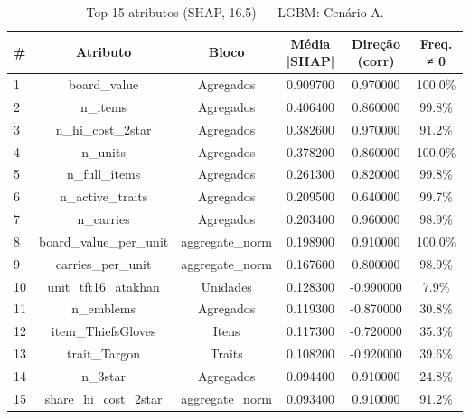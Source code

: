 \begin{table}[htbp]
\caption{Top 15 atributos (SHAP, 16.5) — LGBM: Cenário A.}
\label{tab:toplgbm_A}
\centering
\small
\begin{tabular}{lccccc}
\toprule
\# & Atributo & Bloco & Média |SHAP| & Direção (corr) & Freq. ≠ 0 \\
\midrule
1 & board\_value & Agregados & 0.909700 & 0.970000 & 100.0\% \\
2 & n\_items & Agregados & 0.406400 & 0.860000 & 99.8\% \\
3 & n\_hi\_cost\_2star & Agregados & 0.382600 & 0.970000 & 91.2\% \\
4 & n\_units & Agregados & 0.378200 & 0.860000 & 100.0\% \\
5 & n\_full\_items & Agregados & 0.261300 & 0.820000 & 99.8\% \\
6 & n\_active\_traits & Agregados & 0.209500 & 0.640000 & 99.7\% \\
7 & n\_carries & Agregados & 0.203400 & 0.960000 & 98.9\% \\
8 & board\_value\_per\_unit & aggregate\_norm & 0.198900 & 0.910000 & 100.0\% \\
9 & carries\_per\_unit & aggregate\_norm & 0.167600 & 0.800000 & 98.9\% \\
10 & unit\_tft16\_atakhan & Unidades & 0.128300 & -0.990000 & 7.9\% \\
11 & n\_emblems & Agregados & 0.119300 & -0.870000 & 30.8\% \\
12 & item\_ThiefsGloves & Itens & 0.117300 & -0.720000 & 35.3\% \\
13 & trait\_Targon & Traits & 0.108200 & -0.920000 & 39.6\% \\
14 & n\_3star & Agregados & 0.094400 & 0.910000 & 24.8\% \\
15 & share\_hi\_cost\_2star & aggregate\_norm & 0.093400 & 0.910000 & 91.2\% \\
\bottomrule
\end{tabular}
\end{table}
